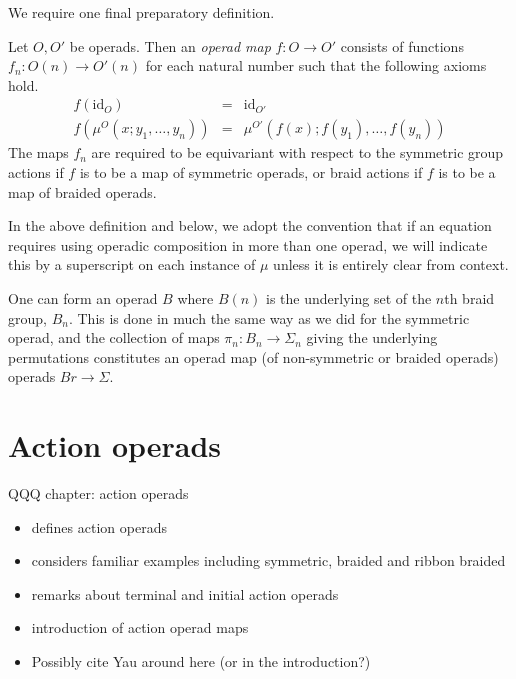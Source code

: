 \documentclass{amsbook} %
\numberwithin{section}{chapter}
\begin{document}
We require one final preparatory definition.

\begin{Defi}
Let $O,O'$ be operads.  Then an \textit{operad map} $f:O \rightarrow O'$ consists of functions $f_{n}:O(n) \rightarrow O'(n)$ for each natural number such that the following axioms hold.
\[
\begin{array}{rcl}
f(\textrm{id}_{O}) & = & \textrm{id}_{O'} \\
f(\mu^{O}(x; y_{1}, \ldots, y_{n})) & = & \mu^{O'}(f(x); f(y_{1}), \ldots, f(y_{n}))
\end{array}
\]
The maps $f_{n}$ are required to be equivariant with respect to the symmetric group actions if $f$ is to be a map of symmetric operads, or braid actions if $f$ is to be a map of braided operads.
\end{Defi}

\begin{conv}
In the above definition and below, we adopt the convention that if an equation requires using operadic composition in more than one operad, we will indicate this by a superscript on each instance of $\mu$ unless it is entirely clear from context.
\end{conv}

\begin{example}
One can form an operad $B$ where $B(n)$ is the underlying set of the $n$th braid group, $B_{n}$.  This is done in much the same way as we did for the symmetric operad, and the collection of maps $\pi_{n}:B_{n} \rightarrow \Sigma_{n}$ giving the underlying permutations constitutes an operad map (of non-symmetric or braided operads) operads $Br \rightarrow \Sigma$.
\end{example}

\section{Action operads}

 	QQQ chapter: action operads
 	\begin{itemize}
 		\item defines action operads 
 		\item considers familiar examples including symmetric, braided and ribbon braided
 		\item remarks about terminal and initial action operads
 		\item introduction of action operad maps
    \item Possibly cite Yau around here (or in the introduction?)
 	\end{itemize}
\end{document}
